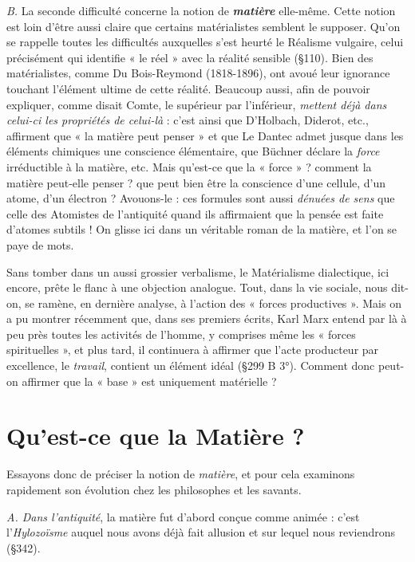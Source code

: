 {\it B.} La seconde difficulté concerne la notion de \textbf{\textit {matière}} elle-même.
Cette notion est loin d’être aussi claire que certains matérialistes
semblent le supposer. Qu’on se rappelle toutes les difficultés
auxquelles s’est heurté le Réalisme vulgaire, celui précisément qui
identifie « le réel » avec la réalité sensible (\S110). Bien des matérialistes,
comme Du Bois-Reymond (1818-1896), ont avoué leur ignorance touchant
l’élément ultime de cette réalité. Beaucoup aussi, afin de pouvoir
expliquer, comme disait Comte, le supérieur par l’inférieur,
{\it mettent déjà dans celui-ci les propriétés de celui-là} : c’est ainsi que
D’Holbach, Diderot, etc., affirment que « la matière peut penser »
et que Le Dantec admet jusque dans les éléments chimiques une
conscience élémentaire, que Büchner déclare la {\it force} irréductible à la
matière, etc. Mais qu’est-ce que la « force » ? comment la matière peut-elle
penser ? que peut bien être la conscience d’une cellule, d’un atome,
d’un électron ? Avouons-le : ces formules sont aussi {\it dénuées de sens} que
celle des Atomistes de l’antiquité quand ils affirmaient que la pensée
est faite d’atomes subtils ! On glisse ici dans un véritable roman de
la matière, et l’on se paye de mots.

\vspace{0.24cm}
{\footnotesize Sans tomber dans un aussi grossier verbalisme, le Matérialisme dialectique,
ici encore, prête le flanc à une objection analogue. Tout, dans la vie
sociale, nous dit-on, se ramène, en dernière analyse, à l’action des « forces
productives ». Mais on a pu montrer récemment que, dans ses premiers
écrits, Karl Marx entend par là à peu près toutes les activités de l’homme,
y comprises même les « forces spirituelles », et plus tard, il continuera à
affirmer que l'acte producteur par excellence, le {\it travail}, contient un élément
idéal (\S 299 B 3°). Comment donc peut-on affirmer que la « base » est uniquement
matérielle ?}
\vspace{0.31cm}

\section{Qu'est-ce que la Matière ?}%
Essayons donc de préciser la
notion de {\it matière}, et pour cela examinons rapidement son évolution
chez les philosophes et les savants.

{\it A. Dans l'antiquité}, la matière fut d’abord conçue comme animée :
c’est l’{\it Hylozoïsme} auquel nous avons déjà fait allusion et sur lequel
nous reviendrons (\S 342).

